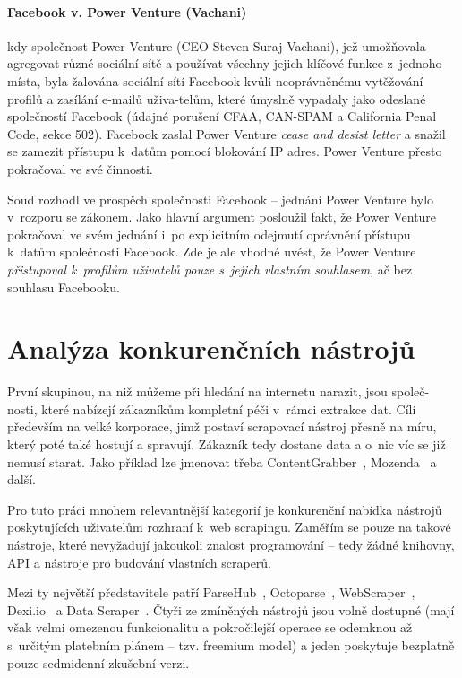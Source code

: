 \documentclass[thesis=B,czech]{FITthesis}[2012/06/26]
\begin{document}
\paragraph{Facebook v. Power Venture (Vachani)} kdy společnost Power Venture (CEO Steven Suraj Vachani), jež umožňovala agregovat různé sociální sítě a používat všechny jejich klíčové funkce z~jednoho místa, byla žalována sociální sítí Facebook kvůli neoprávněnému vytěžování profilů a zasílání e-mailů uživa-telům, které úmyslně vypadaly jako odeslané společností Facebook (údajné porušení CFAA, CAN-SPAM a California Penal Code, sekce 502). Facebook zaslal Power Venture \textit{cease and desist letter} a snažil se zamezit přístupu k~datům pomocí blokování IP adres. Power Venture přesto pokračoval ve své činnosti.~\cite{facebook_venture_1}

Soud rozhodl ve prospěch společnosti Facebook -- jednání Power Venture bylo v~rozporu se zákonem. Jako hlavní argument posloužil fakt, že Power Venture pokračoval ve svém jednání i~po explicitním odejmutí oprávnění přístupu k~datům společnosti Facebook. Zde je ale vhodné uvést, že Power Venture \emph{přistupoval k~profilům uživatelů pouze s~jejich vlastním souhlasem}, ač bez souhlasu Facebooku.~\cite{facebook_venture_2}


\newpage
\section{Analýza konkurenčních nástrojů}
První skupinou, na niž můžeme při hledání na internetu narazit, jsou společ-nosti, které nabízejí zákazníkům kompletní péči v~rámci extrakce dat. Cílí především na velké korporace, jimž postaví scrapovací nástroj přesně na míru, který poté také hostují a spravují. Zákazník tedy dostane data a o~nic víc se již nemusí starat. Jako příklad lze jmenovat třeba ContentGrabber~\cite{content_grabber}, Mozenda~\cite{mozenda} a další.

Pro tuto práci mnohem relevantnější kategorií je konkurenční nabídka nástrojů poskytujících uživatelům rozhraní k~web scrapingu. Zaměřím se pouze na takové nástroje, které nevyžadují jakoukoli znalost programování -- tedy žádné knihovny, API a nástroje pro budování vlastních scraperů.

Mezi ty největší představitele patří ParseHub~\cite{parsehub}, Octoparse~\cite{octoparse}, WebScraper~\cite{webscraper}, Dexi.io~\cite{dexio} a Data Scraper~\cite{data_scraper}. Čtyři ze zmíněných nástrojů jsou volně dostupné (mají však velmi omezenou funkcionalitu a pokročilejší operace se odemknou až s~určitým platebním plánem -- tzv. freemium model) a jeden poskytuje bezplatně pouze sedmidenní zkušební verzi.
\end{document}
